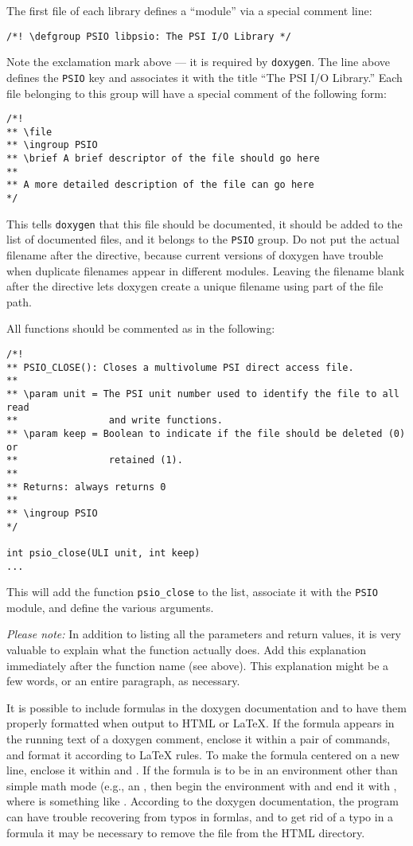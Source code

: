 The first file of each library defines a ``module'' via a special
comment line:
\begin{verbatim}
/*! \defgroup PSIO libpsio: The PSI I/O Library */
\end{verbatim}
Note the exclamation mark above --- it is required by {\tt doxygen}.
The line above defines the {\tt PSIO} key and associates it with the
title ``The PSI I/O Library.'' Each file belonging to this group will
have a special comment of the following form:
\begin{verbatim}
/*!
** \file
** \ingroup PSIO
** \brief A brief descriptor of the file should go here
**
** A more detailed description of the file can go here
*/
\end{verbatim}
This tells {\tt doxygen} that this file should be
documented, it should be added to the list of documented files, and it
belongs to the {\tt PSIO} group.  Do not put the actual filename after
the  directive, because current versions of doxygen have
trouble when duplicate filenames appear in different modules.  Leaving
the filename blank after the  directive lets doxygen create
a unique filename using part of the file path.

All functions should be commented as in the following:
\begin{verbatim}
/*!
** PSIO_CLOSE(): Closes a multivolume PSI direct access file.
**
** \param unit = The PSI unit number used to identify the file to all read
**                and write functions.
** \param keep = Boolean to indicate if the file should be deleted (0) or
**                retained (1).
**
** Returns: always returns 0
**
** \ingroup PSIO
*/

int psio_close(ULI unit, int keep)
...
\end{verbatim}
This will add the function {\tt psio\_close} to the list, associate it with
the {\tt PSIO} module, and define the various arguments.

{\em Please note:} In addition to listing all the parameters and return
values, it is very valuable to explain what the function actually does.
Add this explanation immediately after the function name (see above).  This
explanation might be a few words, or an entire paragraph, as necessary.

It is possible to include formulas in the doxygen documentation
and to have them properly formatted when output to HTML or LaTeX.
If the formula appears in the running text of a doxygen comment,
enclose it within a pair of  commands,
and format it according to LaTeX rules.  To make the formula
centered on a new line, enclose it within \celem{$\backslash$f[} and
\celem{$\backslash$f]}.  If the formula is to be in an environment
other than simple math mode (e.g., an , then begin
the environment with  and end it
with , where  is something
like .  According to the doxygen documentation,
the program can have trouble recovering from typos in formlas, and to
get rid of a typo in a formula it may be necessary to remove the file
 from the HTML directory.


